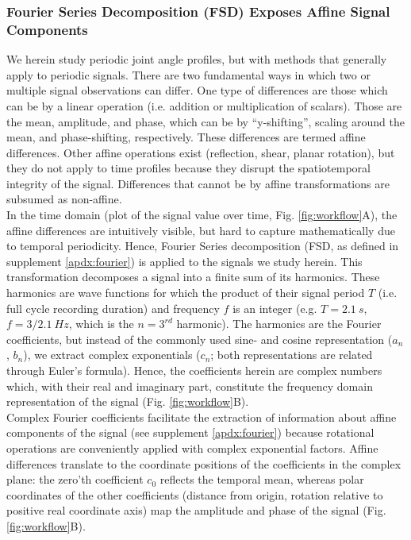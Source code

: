 \subsubsection{Fourier Series Decomposition (FSD) Exposes Affine Signal Components}
We herein study periodic joint angle profiles, but with methods that generally apply to periodic signals.
There are two fundamental ways in which two or multiple signal observations can differ.
One type of differences are those which can be  by a linear operation (i.e. addition or multiplication of scalars).
Those are the mean, amplitude, and phase, which can be  by ``y-shifting'', scaling around the mean, and phase-shifting, respectively.
These differences are termed affine differences.
Other affine operations exist (reflection, shear, planar rotation), but they do not apply to time profiles because they disrupt the spatiotemporal integrity of the signal.
Differences that cannot be  by affine transformations are subsumed as non-affine.
\\In the time domain (plot of the signal value over time, Fig. \ref{fig:workflow}A), the affine differences are intuitively visible, but hard to capture mathematically due to temporal periodicity.
Hence, Fourier Series decomposition (FSD, as defined in supplement \ref*{apdx:fourier}) is applied to the signals we study herein.
This transformation decomposes a signal into a finite sum of its harmonics.
These harmonics are wave functions for which the product of their signal period $T$ (i.e. full cycle recording duration) and frequency $f$ is an integer (e.g. $T = 2.1\ s$, $f = 3/2.1\ Hz$, which is the $n=3^{rd}$ harmonic).
The harmonics are the Fourier coefficients, but instead of the commonly used sine- and cosine representation ($a_{n}$, $b_{n}$), we extract complex exponentials ($c_{n}$; both representations are related through Euler's formula).
Hence, the coefficients herein are complex numbers which, with their real and imaginary part, constitute the frequency domain representation of the signal (Fig. \ref{fig:workflow}B).
\\Complex Fourier coefficients facilitate the extraction of information about affine components of the signal (see supplement \ref*{apdx:fourier}) because rotational operations are conveniently applied with complex exponential factors.
Affine differences translate to the coordinate positions of the coefficients in the complex plane: the zero'th coefficient $c_{0}$ reflects the temporal mean, whereas polar coordinates of the other coefficients  (distance from origin, rotation relative to positive real coordinate axis) map the amplitude and phase of the signal (Fig. \ref{fig:workflow}B).
